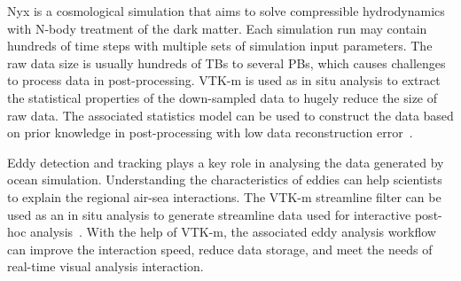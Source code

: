 Nyx is a cosmological simulation that aims to solve compressible hydrodynamics with N-body treatment of the dark matter. Each simulation run may contain hundreds of time steps with multiple sets of simulation input parameters. The raw data size is usually hundreds of TBs to several PBs, which causes challenges to process data in post-processing. 
VTK-m is used as in situ analysis to extract the statistical properties of the down-sampled data to hugely reduce the size of raw data. The associated statistics model can be used to construct the data based on prior knowledge in post-processing with low data reconstruction error~\cite{Wang2019}.

Eddy detection and tracking plays a key role in analysing the data generated by ocean simulation. Understanding the characteristics of eddies can help scientists to explain the regional air-sea interactions.
The VTK-m streamline filter can be used as an in situ analysis to generate streamline data used for interactive post-hoc analysis~\cite{Han2022}. With the help of VTK-m, the associated eddy analysis workflow can improve the interaction speed, reduce data storage, and meet the
needs of real-time visual analysis interaction.  

